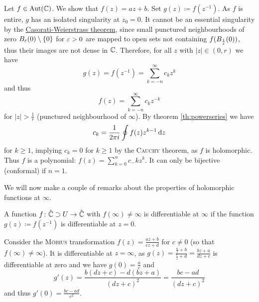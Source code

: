 \documentclass[a4paper,english]{article}
\begin{document}
\begin{pr}
    Let $f \in \operatorname{Aut}(\operatorname{\mathbb{C}})$.
    We show that $f(z) = a z + b$.
    Set $g(z) \coloneqq f(z^{-1})$.
    As $f$ is entire, $g$ has an isolated singularity at $z_0 = 0$.
    It cannot be an essential singularity by the \hyperref[th:CW]{Casorati-Weierstrass theorem}, since small punctured neighbourhoods of zero $B_{\varepsilon}(0) \setminus \{0\}$ for $\varepsilon > 0$ are mapped to open sets not containing $f(B_{\frac{1}{\varepsilon}}(0))$, thus their images are not dense in $\operatorname{\mathbb{C}}$.
    Therefore, for all $z$ with $| z | \in (0, r)$ we have
    \begin{equation*}
        g(z)
        = f\left(z^{-1}\right)
        = \sum_{k = -n}^{\infty} c_k z^k
    \end{equation*}
    and thus
    \begin{equation*}
        f(z)
        = \sum_{k = - n}^{\infty} c_{k} z^{-k}
    \end{equation*}
    for $| z | > \frac{1}{r}$ (punctured neighbourhood of $\infty$).
    By theorem \ref{th:powerseries} we have
    \begin{equation*}
        c_k
        = \frac{1}{2 \pi i} \oint f(z) z^{k - 1} \mathop{}\!\mathrm{d}{z}
    \end{equation*}
    for $k \ge 1$, implying $c_k = 0$ for $k \ge 1$ by the \textsc{Cauchy} theorem, as $f$ is holomorphic.
    Thus $f$ is a polynomial: $f(z) = \sum_{k = 0}^{n} c_{-}k z^{k}$.
    It can only be bijective (conformal) if $n = 1$.
\end{pr}
    
We will now make a couple of remarks about the properties of holomorphic functions at $\infty$.  

\begin{defn}
    A function $f \colon \hat{\operatorname{\mathbb{C}}} \supset U \to \hat{\operatorname{\mathbb{C}}}$ with $f(\infty) \ne \infty$ is differentiable at $\infty$ if the function $g(z) \coloneqq f(z^{-1})$ is differentiable at $z = 0$.
\end{defn}

\begin{exampleB}
    Consider the \textsc{Möbius} transformation $f(z) = \frac{a z + b}{c z + d}$ for $c \ne 0$ (so that $f(\infty) \ne \infty$).
    It is differentiable at $z = \infty$, as $g(z) = \frac{\frac{a}{z} + b}{\frac{c}{z} +d} = \frac{b z + a}{d z + c}$ is differentiable at zero and we have $g(0) = \frac{a}{c}$ and
    \begin{equation*}
        g'(z)
        = \frac{b( d z + c) - d (b z + a)}{(d z + c)^2}
        = \frac{b c - a d}{(d z + c)^2}
    \end{equation*}
    and thus $g'(0) = \frac{b c -  a d}{c^2}$.
\end{exampleB}
\end{document}

